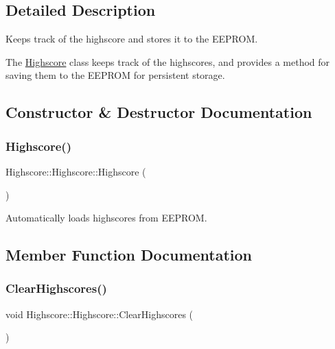 \subsection{Detailed Description}
Keeps track of the highscore and stores it to the E\+E\+P\+R\+OM. 

The \hyperlink{class_highscore_1_1_highscore}{Highscore} class keeps track of the highscores, and provides a method for saving them to the E\+E\+P\+R\+OM for persistent storage. 

\subsection{Constructor \& Destructor Documentation}
\hypertarget{class_highscore_1_1_highscore_a64076b0cd51d8045a6cac3e53e2ada79}{}\label{class_highscore_1_1_highscore_a64076b0cd51d8045a6cac3e53e2ada79} 
\subsubsection{\texorpdfstring{Highscore()}{Highscore()}}
{\footnotesize\ttfamily Highscore\+::\+Highscore\+::\+Highscore (\begin{DoxyParamCaption}{ }\end{DoxyParamCaption})}

Automatically loads highscores from E\+E\+P\+R\+OM. 

\subsection{Member Function Documentation}
\hypertarget{class_highscore_1_1_highscore_ad2d0f11408e3d47c7b8434a71212f6c2}{}\label{class_highscore_1_1_highscore_ad2d0f11408e3d47c7b8434a71212f6c2} 
\subsubsection{\texorpdfstring{Clear\+Highscores()}{ClearHighscores()}}
{\footnotesize\ttfamily void Highscore\+::\+Highscore\+::\+Clear\+Highscores (\begin{DoxyParamCaption}{ }\end{DoxyParamCaption})}

